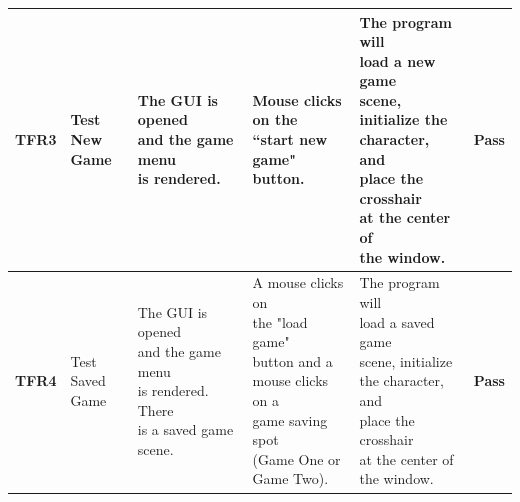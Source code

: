 \documentclass[12pt, titlepage]{article}
\begin{document}
\begin{center}
\begin{longtable}[!bpht]{|m{1.3cm}|m{2.3cm}|m{3.4cm}|m{3.4cm}|m{3.4cm}|m{1cm}|}
\textbf{TFR3} & \makecell[ml]{Test New\\ Game} & \makecell[ml]{The GUI is opened\\ and the game menu\\ is rendered.} & \makecell[ml]{Mouse clicks on the\\ ``start new game"\\ button.} & \makecell[ml]{The program will\\ load a new game\\ scene, initialize the\\ character, and\\ place the crosshair\\ at the center of\\ the window.} & \textbf{Pass}\\\hline

\textbf{TFR4} & \makecell[ml]{Test Saved\\ Game} & \makecell[ml]{The GUI is opened\\ and the game menu\\ is rendered. There\\ is a saved game\\ scene.} & \makecell[ml]{A mouse clicks on\\ the "load game"\\ button and a\\ mouse clicks on a\\ game saving spot\\(Game One or\\ Game Two).} & \makecell[ml]{The program will\\ load a saved game\\ scene, initialize\\ the character, and\\ place the crosshair\\ at the center of\\ the window.} & \textbf{Pass}\\\hline


\end{longtable}
\end{center}
\end{document}

